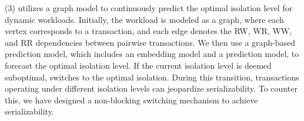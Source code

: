 
(3) \sysname utilizes a graph model to continuously predict the optimal isolation level for dynamic workloads. 
Initially, the workload is modeled as a graph, where each vertex corresponds to a transaction, and each edge denotes the RW, WR, WW, and RR dependencies between pairwise transactions. We then use a graph-based prediction model, which includes an embedding model and a prediction model, to forecast the optimal isolation level.
If the current isolation level is deemed suboptimal, \sysname switches to the optimal isolation. During this transition, transactions operating under different isolation levels can jeopardize serializability. To counter this, we have designed a non-blocking switching mechanism to achieve serializability. 

